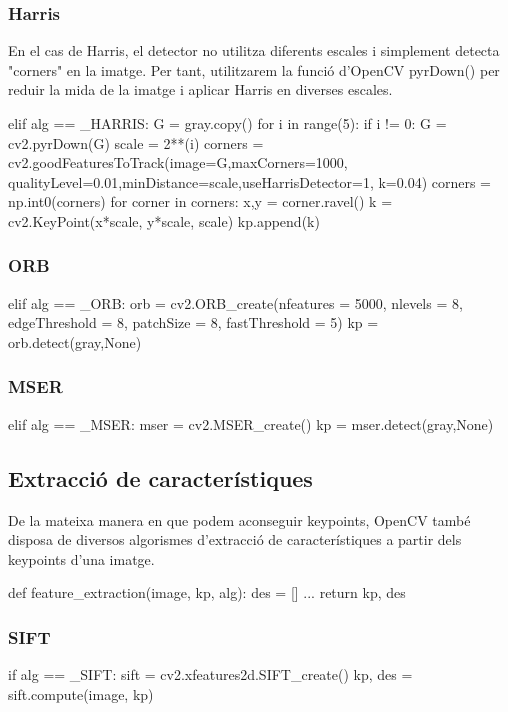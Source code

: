 		\subsubsection{Harris}
		En el cas de Harris, el detector no utilitza diferents escales i simplement detecta "corners" en la imatge. Per tant, utilitzarem la funció d'OpenCV pyrDown() per reduir la mida de la imatge i aplicar
		Harris en diverses escales.
		\begin{python}
	elif alg == _HARRIS:
		G = gray.copy()
		for i in range(5):
			if i != 0:
				G = cv2.pyrDown(G)
			scale = 2**(i)
			corners = cv2.goodFeaturesToTrack(image=G,maxCorners=1000,
				qualityLevel=0.01,minDistance=scale,useHarrisDetector=1, k=0.04)
			corners = np.int0(corners)
			for corner in corners:
				x,y = corner.ravel()
				k = cv2.KeyPoint(x*scale, y*scale, scale)
				kp.append(k)
		\end{python}

		\subsubsection{ORB}
		\begin{python}
	elif alg == _ORB:
		orb = cv2.ORB_create(nfeatures = 5000, nlevels = 8, edgeThreshold = 8,
		 patchSize = 8, fastThreshold = 5)
		kp = orb.detect(gray,None)
		\end{python}

		\subsubsection{MSER}
		\begin{python}
	elif alg == _MSER:
		mser = cv2.MSER_create()
		kp = mser.detect(gray,None)
		\end{python}

	\subsection{Extracció de característiques}
		De la mateixa manera en que podem aconseguir keypoints, OpenCV també disposa de diversos algorismes d'extracció de característiques a partir dels keypoints d'una imatge.\\
		\begin{python}
def feature_extraction(image, kp, alg):
	des = []
	...
	return kp, des
		\end{python}

		\subsubsection{SIFT}
		\begin{python}
	if alg == _SIFT:
		sift = cv2.xfeatures2d.SIFT_create()
		kp, des = sift.compute(image, kp)
		\end{python}

